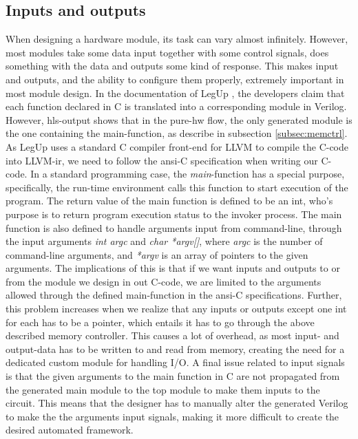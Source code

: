 \subsection{\label{subsec:inoutprobs}Inputs and outputs}
When designing a hardware module, its task can vary almost infinitely. However, most modules take some data input together with some control signals, does something with the data and outputs some kind of response. This makes input and outputs, and the ability to configure them properly, extremely important in most module design. In the documentation of LegUp \cite{leguparch}, the developers claim that each function declared in C is translated into a corresponding module in Verilog. However, \gls{hls}-output shows that in the pure-\gls{hw} flow, the only generated module is the one containing the main-function, as describe in subsection \ref{subsec:memctrl}. As LegUp uses a standard C compiler front-end for LLVM to compile the C-code into LLVM-\gls{ir}, we need to follow the \gls{ansi}-C specification \cite{isoc} when writing our C-code. In a standard programming case, the \textit{main}-function has a special purpose, specifically, the run-time environment calls this function to start execution of the program. The return value of the main function is defined to be an int, who's purpose is to return program execution status to the invoker process. The main function is also defined to handle arguments input from command-line, through the input arguments \textit{int argc} and \textit{char *argv[]}, where \textit{argc} is the number of command-line arguments, and \textit{*argv} is an array of pointers to the given arguments. The implications of this is that if we want inputs and outputs to or from the module we design in out C-code, we are limited to the arguments allowed through the defined main-function in the \gls{ansi}-C specifications. Further, this problem increases when we realize that any inputs or outputs except one int for each has to be a pointer, which entails it has to go through the above described memory controller. This causes a lot of overhead, as most input- and output-data has to be written to and read from memory, creating the need for a dedicated custom module for handling I/O. A final issue related to input signals is that the given arguments to the main function in C are not propagated from the generated main module to the top module to make them inputs to the circuit. This means that the designer has to manually alter the generated Verilog to make the the arguments input signals, making it more difficult to create the desired automated framework.
